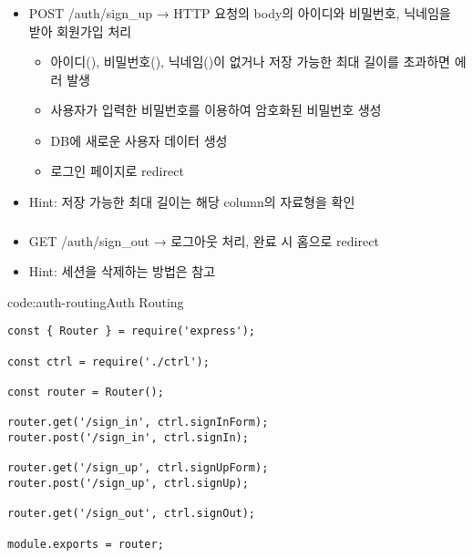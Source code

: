 \subsubsection*{}
\begin{itemize}
    \item POST /auth/sign\_up → HTTP 요청의 body의 아이디와 비밀번호, 닉네임을 받아 회원가입 처리
    \begin{itemize}
        \item 아이디(), 비밀번호(), 닉네임()이 없거나 저장 가능한 최대 길이를 초과하면  에러 발생
        \item 사용자가 입력한 비밀번호를 이용하여 암호화된 비밀번호 생성
        \item DB에 새로운 사용자 데이터 생성
        \item 로그인 페이지로 redirect
    \end{itemize}
    \item Hint: 저장 가능한 최대 길이는 해당 column의 자료형을 확인
\end{itemize}

\subsubsection*{}
\begin{itemize}
    \item GET /auth/sign\_out → 로그아웃 처리, 완료 시 홈으로 redirect
    \item Hint: 세션을 삭제하는 방법은  참고
\end{itemize}

\begin{codeenv}{code:auth-routing}{Auth Routing}\begin{verbatim}
const { Router } = require('express');

const ctrl = require('./ctrl');

const router = Router();

router.get('/sign_in', ctrl.signInForm);
router.post('/sign_in', ctrl.signIn);

router.get('/sign_up', ctrl.signUpForm);
router.post('/sign_up', ctrl.signUp);

router.get('/sign_out', ctrl.signOut);

module.exports = router;
\end{verbatim}
\end{codeenv}

